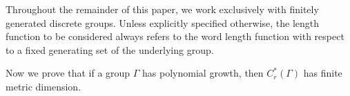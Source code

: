\documentclass[a4paper,11pt,reqno]{amsart}
\theoremstyle{plain}
\newtheorem{lem}[thm]{Lemma}
\theoremstyle{mainthmstyle}
\theoremstyle{named}
\numberwithin{equation}{section}
\newcommand{\Bea}{\begin{eqnarray*}}
\begin{document}
\vspace{2mm}
Throughout the remainder of this paper, we work exclusively with finitely generated discrete groups. Unless explicitly specified otherwise, the length function to be considered always refers to the word length function with respect to a fixed generating set of the underlying group.

\vspace{2mm}

Now we prove that if a group $\Gamma$ has polynomial growth, then $C^{\ast}_{r}(\Gamma)$ has finite metric dimension.
\end{document}
